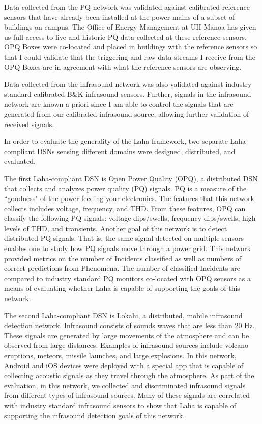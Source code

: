 Data collected from the PQ network was validated against calibrated reference sensors that have already been installed at the power mains of a subset of buildings on campus. The Office of Energy Management at UH Manoa has given us full access to live and historic PQ data collected at these reference sensors. OPQ Boxes were co-located and placed in buildings with the reference sensors so that I could validate that the triggering and raw data streams I receive from the OPQ Boxes are in agreement with what the reference sensors are observing.

Data collected from the infrasound network was also validated against industry standard calibrated B\&K infrasound sensors. Further, signals in the infrasound network are known a priori since I am able to control the signals that are generated from our calibrated infrasound source, allowing further validation of received signals.

In order to evaluate the generality of the Laha framework, two separate Laha-compliant DSNs sensing different domains were designed, distributed, and evaluated.

The first Laha-compliant DSN is Open Power Quality (OPQ), a distributed DSN that collects and analyzes power quality (PQ) signals. PQ is a measure of the ``goodness" of the power feeding your electronics. The features that this network collects includes voltage, frequency, and THD. From these features, OPQ can classify the following PQ signals: voltage dips/swells, frequency dips/swells, high levels of THD, and transients. Another goal of this network is to detect distributed PQ signals. That is, the same signal detected on multiple sensors enables one to study how PQ signals move through a power grid. This network provided metrics on the number of Incidents classified as well as numbers of correct predictions from Phenomena. The number of classified Incidents are compared to industry standard PQ monitors co-located with OPQ sensors as a means of evaluating whether Laha is capable of supporting the goals of this network.

The second Laha-compliant DSN is Lokahi, a distributed, mobile infrasound detection network. Infrasound consists of sounds waves that are less than 20 Hz. These signals are generated by large movements of the atmosphere and can be observed from large distances. Examples of infrasound sources include volcano eruptions, meteors, missile launches, and large explosions. In this network, Android and iOS devices were deployed with a special app that is capable of collecting acoustic signals as they travel through the atmosphere. As part of the evaluation, in this network, we collected and discriminated infrasound signals from different types of infrasound sources. Many of these signals are correlated with industry standard infrasound sensors to show that Laha is capable of supporting the infrasound detection goals of this network.

